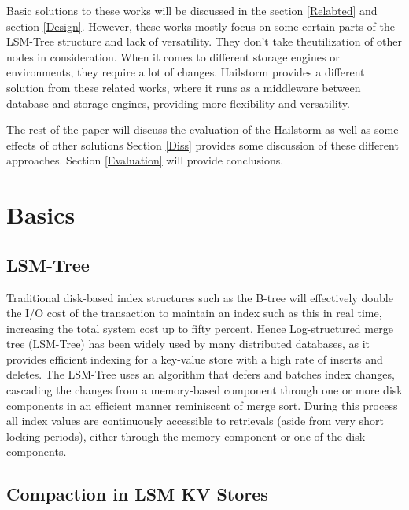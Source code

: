\documentclass[a4paper,10pt,twoside]{article}
\begin{document}
Basic solutions to these works will be discussed in the section \ref{Relabted} and section \ref{Design}.
However, these works mostly focus on some certain parts of the LSM-Tree structure and lack of versatility.
They don’t take theutilization of other nodes in consideration. 
When it comes to different storage engines or environments, they require a lot of changes.
Hailstorm provides a different solution from these related works, where it runs as a middleware between database and storage engines, providing more flexibility and versatility.
\par
The rest of the paper will discuss the evaluation of the Hailstorm as well as some effects of other solutions
Section \ref{Diss} provides some discussion of these different approaches.
Section \ref{Evaluation} will provide conclusions.

\section{Basics}
\label{Basics}

\subsection{LSM-Tree}
\label{Basic.LSM-tree}

Traditional disk-based index structures such as the B-tree will effectively double the I/O cost of the transaction to maintain an index such as this in real time, increasing the total system cost up to fifty percent. 
Hence Log-structured merge tree (LSM-Tree) \cite{LSM-Tree} has been widely used by many distributed databases, as it provides efficient indexing for a key-value store with a high rate of inserts and deletes.
The LSM-Tree uses an algorithm that defers and batches index changes, cascading the changes from a memory-based component through one or more disk components in an efficient manner reminiscent of merge sort. 
During this process all index values are continuously accessible to retrievals (aside from very short locking periods), either through the memory component or one of the disk components.

\subsection{Compaction in LSM KV Stores}
\label{Basic.Compaction}
\end{document}
